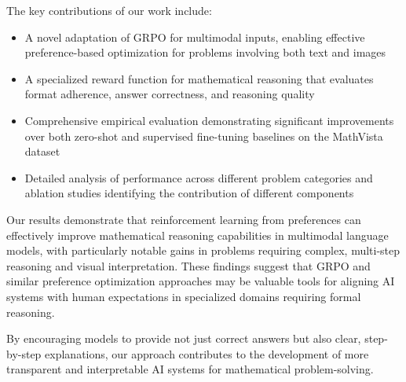 \documentclass[11pt,a4paper]{article}
\begin{document}
The key contributions of our work include:

\begin{itemize}
    \item A novel adaptation of GRPO for multimodal inputs, enabling effective preference-based optimization for problems involving both text and images
    \item A specialized reward function for mathematical reasoning that evaluates format adherence, answer correctness, and reasoning quality
    \item Comprehensive empirical evaluation demonstrating significant improvements over both zero-shot and supervised fine-tuning baselines on the MathVista dataset
    \item Detailed analysis of performance across different problem categories and ablation studies identifying the contribution of different components
\end{itemize}

Our results demonstrate that reinforcement learning from preferences can effectively improve mathematical reasoning capabilities in multimodal language models, with particularly notable gains in problems requiring complex, multi-step reasoning and visual interpretation. These findings suggest that GRPO and similar preference optimization approaches may be valuable tools for aligning AI systems with human expectations in specialized domains requiring formal reasoning.

By encouraging models to provide not just correct answers but also clear, step-by-step explanations, our approach contributes to the development of more transparent and interpretable AI systems for mathematical problem-solving.



\end{document}
